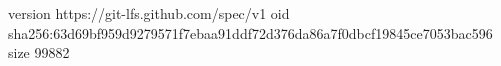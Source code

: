 version https://git-lfs.github.com/spec/v1
oid sha256:63d69bf959d9279571f7ebaa91ddf72d376da86a7f0dbcf19845ce7053bac596
size 99882
